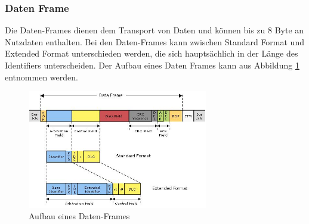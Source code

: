 	\subsubsection{Daten Frame}
	Die Daten-Frames dienen dem Transport von Daten und können bis zu 8 Byte an Nutzdaten enthalten. Bei den Daten-Frames kann zwischen Standard Format und Extended Format unterschieden werden, die sich hauptsächlich in der Länge des Identifiers unterscheiden. Der Aufbau eines Daten Frames kann aus Abbildung \ref{data} entnommen werden.
	
	\begin{figure}[htbp]
		\centering
		\includegraphics[width=0.7\textwidth]{figures/data-frame}
		\caption{Aufbau eines Daten-Frames \citep{HYC}}
		\label{data}
	\end{figure}
		
